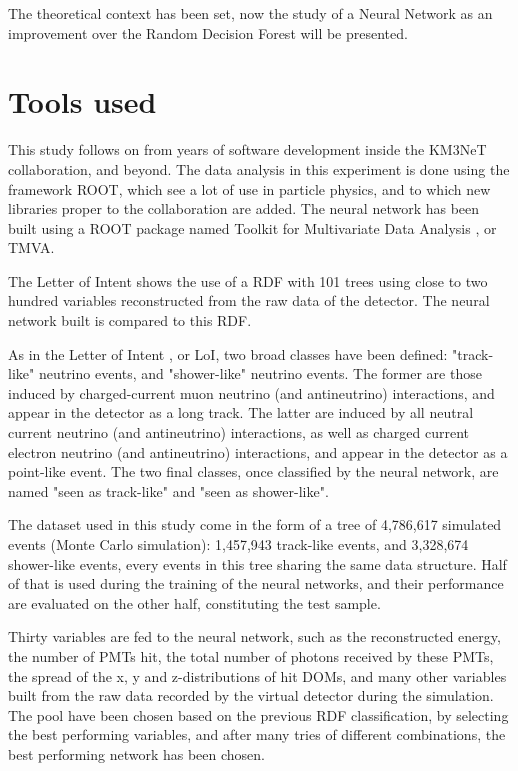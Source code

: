 The theoretical context has been set, now the study of a Neural Network as an improvement over the Random Decision Forest will be presented.

\section{Tools used}

This study follows on from years of software development inside the KM3NeT collaboration, and beyond. The data analysis in this experiment is done using the framework ROOT, which see a lot of use in particle physics, and to which new libraries proper to the collaboration are added. The neural network has been built using a ROOT package named Toolkit for Multivariate Data Analysis \citep{2007physics...3039H}, or TMVA.

The Letter of Intent shows the use of a RDF with 101 trees using close to two hundred variables reconstructed from the raw data of the detector. The neural network built is compared to this RDF.

As in the Letter of Intent \citep{Adrian-Martinez:2016fdl}, or LoI, two broad classes have been defined: "track-like" neutrino events, and "shower-like" neutrino events. The former are those induced by charged-current muon neutrino (and antineutrino) interactions, and appear in the detector as a long track. The latter are induced by all neutral current neutrino (and antineutrino) interactions, as well as charged current electron neutrino (and antineutrino) interactions, and appear in the detector as a point-like event. The two final classes, once classified by the neural network, are named "seen as track-like" and "seen as shower-like".

The dataset used in this study come in the form of a tree of 4,786,617 simulated events (Monte Carlo simulation): 1,457,943 track-like events, and 3,328,674 shower-like events, every events in this tree sharing the same data structure. Half of that is used during the training of the neural networks, and their performance are evaluated on the other half, constituting the test sample.

Thirty variables are fed to the neural network, such as the reconstructed energy, the number of PMTs hit, the total number of photons received by these PMTs, the spread of the x, y and z-distributions of hit DOMs, and many other variables built from the raw data recorded by the virtual detector during the simulation. The pool have been chosen based on the previous RDF classification, by selecting the best performing variables, and after many tries of different combinations, the best performing network has been chosen.

